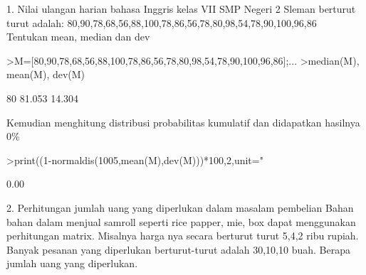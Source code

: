 \documentclass[12pt,Times new roman,letterpaper]{book}
\begin{document}
\begin{eulernootebook}
\begin{eulercomment}
\begin{eulercomment}
\begin{eulernootebook}
\begin{eulercomment}
\begin{eulercomment}
\begin{eulercomment}
\begin{eulercomment}
\begin{eulercomment}
\begin{eulercomment}
\begin{eulercomment}
\begin{eulercomment}
\begin{eulercomment}
\begin{eulercomment}
\begin{eulercomment}
\begin{eulercomment}
\begin{eulercomment}
\begin{euleroutput}
  [0.34485,  0.080751,  0.87652,  0.75416,  0.68839]
\end{euleroutput}
\begin{eulercomment}
1. Nilai ulangan harian bahasa Inggris kelas VII SMP Negeri 2 Sleman
berturut turut adalah:
80,90,78,68,56,88,100,78,86,56,78,80,98,54,78,90,100,96,86\\
Tentukan mean, median dan dev
\end{eulercomment}
\begin{eulerprompt}
>M=[80,90,78,68,56,88,100,78,86,56,78,80,98,54,78,90,100,96,86];...
>median(M), mean(M), dev(M)
\end{eulerprompt}
\begin{euleroutput}
  80
  81.053
  14.304
\end{euleroutput}
\begin{eulercomment}
Kemudian menghitung distribusi probabilitas kumulatif dan didapatkan
hasilnya 0\%
\end{eulercomment}
\begin{eulerprompt}
>print((1-normaldis(1005,mean(M),dev(M)))*100,2,unit=" %
\end{eulerprompt}
\begin{euleroutput}
        0.00 %
\end{euleroutput}
\begin{eulercomment}
2. Perhitungan jumlah uang yang diperlukan dalam masalam pembelian
Bahan bahan dalam menjual samroll seperti rice papper, mie, box dapat
menggunakan perhitungan matrix. Misalnya harga nya secara berturut
turut 5,4,2 ribu rupiah. Banyak pesanan yang diperlukan berturut-turut
adalah 30,10,10 buah. Berapa jumlah uang yang diperlukan.

\end{eulercomment}
\begin{eulerttcomment}
 

\end{eulerttcomment}
\end{eulercomment}
\end{eulercomment}
\end{eulercomment}
\end{eulercomment}
\end{eulercomment}
\end{eulercomment}
\end{eulercomment}
\end{eulercomment}
\end{eulercomment}
\end{eulercomment}
\end{eulercomment}
\end{eulercomment}
\end{eulercomment}
\end{eulernootebook}
\end{eulercomment}
\end{eulercomment}
\end{eulernootebook}
\end{document}
